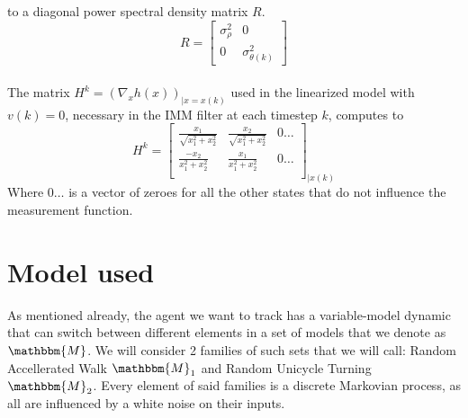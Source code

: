 \documentclass[twocolumn]{article}
\begin{document}
    to a diagonal power spectral density matrix $R$.
    \begin{equation*}
        R=\begin{bmatrix}
            \sigma^{2}_{\rho}&0\\
            0&\sigma^{2}_{\theta (k)}
        \end{bmatrix}
    \end{equation*}
    \\
   The matrix $H^{k}=(\nabla_{x} h(x))_{|x=x(k)}$ used in the linearized model with $v(k)=0$, necessary in the IMM filter at each timestep $k$,
   computes to 
    \begin{equation*}
        H^{k}= \begin{bmatrix}
            \frac{x_{1}}{\sqrt{x_{1}^{2}+x_{2}^{2}}} & \frac{x_{2}}{\sqrt{x_{1}^{2}+x_{2}^{2}}}& 0 \dots\\
            \frac{-x_{2}}{x_{1}^{2}+x_{2}^{2}}  & \frac{x_{1}}{x_{1}^{2}+x_{2}^{2}}& 0 \dots\\
        \end{bmatrix}_{|x(k)}
    \end{equation*}
    Where $0\dots$ is a vector of zeroes for all the other states that do not influence the measurement function.
  
    \section*{Model used}
    As mentioned already, the agent we want to track has a variable-model dynamic that can switch between different elements in a set 
    of models that we denote as $\mathbbm{M}$. We will consider 2 families of such sets that we will call: Random Accellerated Walk $\mathbbm{M}_{1}$ 
    and Random Unicycle Turning $\mathbbm{M}_{2}$. Every element of said families is a discrete Markovian process, as all are influenced by a white 
    noise on their inputs.
\end{document}
